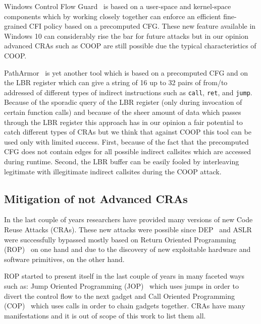 Windows Control Flow Guard~\cite{windows:cfguard} is based on a user-space and kernel-space components which
by working closely together can enforce an efficient fine-grained CFI policy based on a precomputed CFG.
These new feature available in Windows 10 can considerably rise the bar for future attacks but in our opinion advanced CRAs
such as COOP are still possible due the typical characteristics of COOP.

PathArmor~\cite{veen:cfi} is yet another tool which is based on a precomputed CFG and on the LBR register which can give a string of 16 up to
32 pairs of from/to addressed of different types of indirect instructions such as \texttt{call}, \texttt{ret}, and \texttt{jump}. 
Because of the sporadic query of the LBR register (only during invocation of certain function calls) and because of the sheer amount of 
data which passes through the LBR register this approach has in our opinion a fair potential to catch different types of CRAs but
we think that against COOP this tool can be used only with limited success. 
First, because of the fact that the precomputed CFG does not contain edges for all
possible indirect callsites which are accessed during runtime. Second, the LBR buffer can be easily fooled by interleaving
legitimate with illegitimate indirect callsites during the COOP attack.

\subsection{Mitigation of not Advanced CRAs}
\label{Mitigation of Code-Reuse Attacks}
In the last couple of years researchers have provided many versions of new Code Reuse Attacks (CRAs).
These new attacks were possible since DEP~\cite{dep} and ASLR~\cite{ASLR} were successfully bypassed mostly based
on Return Oriented Programming (ROP)~\cite{ROP, kornau:rop, rop:shacham} on one hand and due to the discovery of 
new exploitable hardware and software primitives, on the other hand.

ROP started to present itself in the last couple of years in many faceted ways such as:
Jump Oriented Programming (JOP)~\cite{JOP1, JOP2, JOP3} which uses jumps in order to divert the control flow to the next gadget and 
Call Oriented Programming (COP)~\cite{rop:carlini} which uses calls in order to chain gadgets together.
CRAs have many manifestations and it is out of scope of this work to list them all.


